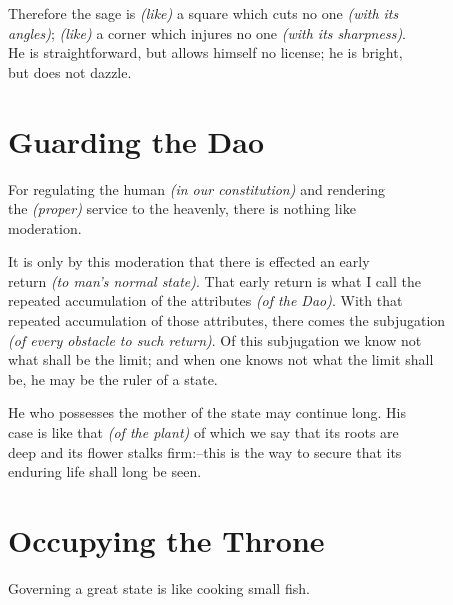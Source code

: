     Therefore the sage is \textit{(like)} a square which cuts no one \textit{(with its\\
    angles)}; \textit{(like)} a corner which injures no one \textit{(with its sharpness)}.\\
    He is straightforward, but allows himself no license; he is bright,\\
    but does not dazzle.\vspace{\baselineskip}
\newpage{}
\section*{Guarding the Dao}
    For regulating the human \textit{(in our constitution)} and rendering\\
    the \textit{(proper)} service to the heavenly, there is nothing like\\
    moderation.\vspace{\baselineskip}
    
    It is only by this moderation that there is effected an early\\
    return \textit{(to man's normal state)}. That early return is what I call the\\
    repeated accumulation of the attributes \textit{(of the Dao)}. With that\\
    repeated accumulation of those attributes, there comes the subjugation\\
    \textit{(of every obstacle to such return)}. Of this subjugation we know not\\
    what shall be the limit; and when one knows not what the limit shall\\
    be, he may be the ruler of a state.\vspace{\baselineskip}
    
    He who possesses the mother of the state may continue long. His\\
    case is like that \textit{(of the plant)} of which we say that its roots are\\
    deep and its flower stalks firm:--this is the way to secure that its\\
    enduring life shall long be seen.\vspace{\baselineskip}
    
\section*{Occupying the Throne}
    Governing a great state is like cooking small fish.\vspace{\baselineskip}
    
